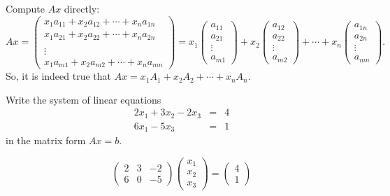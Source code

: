 \documentclass{ximera}
\begin{document}
\begin{exercise}
\begin{solution}
Compute $Ax$ directly:
\[ Ax = \left(\begin{array}{c} x_1a_{11} + x_2a_{12} + \cdots +
x_na_{1n} \\  x_1a_{21} + x_2a_{22} + \cdots + x_na_{2n} \\
\\ \vdots \\ x_1a_{m1} + x_2a_{m2} + \cdots + x_na_{mn}
\end{array}\right) = x_1\left(\begin{array}{r} a_{11} \\ a_{21} \\
\vdots \\ a_{m1} \end{array}\right) + x_2\left(\begin{array}{r}
a_{12} \\ a_{22} \\ \vdots \\ a_{m2} \end{array}\right) + \cdots
+ x_n\left(\begin{array}{r} a_{1n} \\ a_{2n} \\
\vdots \\ a_{mn} \end{array}\right). \]
So, it is indeed true that $Ax = x_1A_1 + x_2A_2 + \cdots
+ x_nA_n$.


\end{solution}
\end{exercise}

\problemlabel

\begin{exercise} \label{c4.1.4}
Write the system of linear equations
\begin{eqnarray*}
2x_1 + 3x_2 - 2x_3 & = & 4\\
6x_1 -5x_3 & = & 1
\end{eqnarray*}
in the matrix form $Ax=b$.

\begin{solution}

\[
\left(\begin{array}{rrr} 2 & 3 & -2 \\ 6 & 0 & -5\end{array}\right) 
\left(\begin{array}{r} x_1 \\ x_2 \\ x_3\end{array}\right) = 
\left(\begin{array}{r} 4 \\ 1\end{array}\right)
\]


\end{solution}
\end{exercise}
\end{document}
